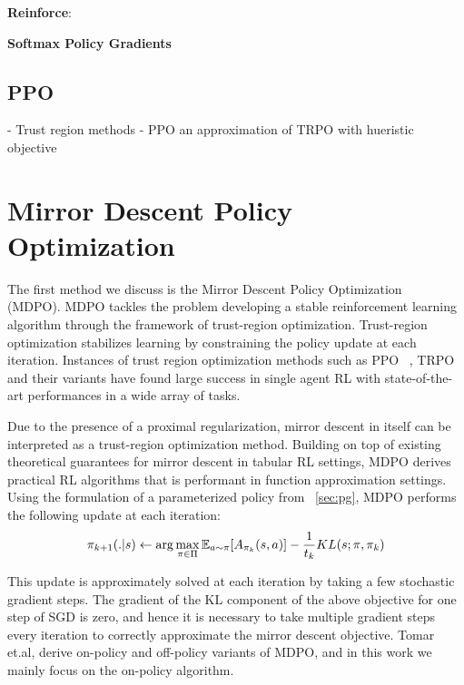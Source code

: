 \textbf{Reinforce}:

\textbf{Softmax Policy Gradients}

\subsection{PPO}

- Trust region methods
- PPO an approximation of TRPO with hueristic objective

\section[MDPO]{Mirror Descent Policy Optimization}

The first method we discuss is the Mirror Descent Policy Optimization~ \cite{tomarMirror2022}
(MDPO).
MDPO tackles the problem developing a stable reinforcement learning algorithm through the framework
of trust-region optimization.
Trust-region optimization stabilizes learning by constraining the policy update at each iteration.
Instances of trust region optimization methods such as PPO~ \cite{schulmanProximal2017}, TRPO~
\cite{schulmanTrust2015} and their variants have found large success in single agent RL with
state-of-the-art performances in a wide array of tasks.

Due to the presence of a proximal regularization, mirror descent in itself can be interpreted as a
trust-region optimization method.
Building on top of existing theoretical guarantees for mirror descent in tabular RL settings, MDPO
derives practical RL algorithms that is performant in function approximation settings.
Using the formulation of a parameterized policy from~ \ref{sec:pg}, MDPO performs the following
update at each iteration:
\begin{equation}
	\label{eqn:mdrl} \pi_{k+1}(.
	|s) \leftarrow \arg
	\max_{\pi \in \Pi}
	\mathbb{E}_{a \sim \pi} [A_{\pi_k}(s,a)] -
	\frac{1}{t_k}
	KL(s; \pi, \pi_k)
\end{equation}

This update is approximately solved at each
iteration by taking a few stochastic gradient steps.
The gradient of the KL component of the above objective for one step of SGD is zero, and hence it
is necessary to take multiple gradient steps every iteration to correctly approximate the mirror
descent objective.
Tomar et.al, derive on-policy and off-policy variants of MDPO, and in this work we mainly focus on
the on-policy algorithm.

